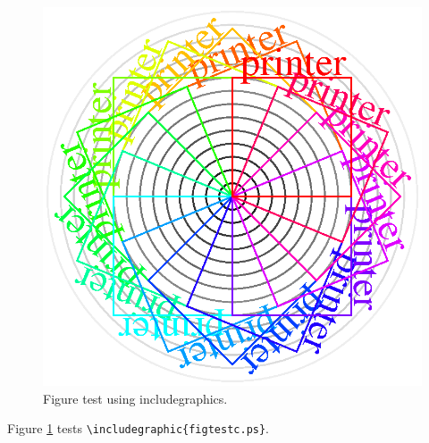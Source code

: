 \documentclass{article}
\begin{document}
\begin{figure}
\includegraphics{figtestc.ps}
\caption{Figure test using includegraphics.} 
\label{figure4}
\end{figure}

Figure  \ref{figure4} tests \verb#\includegraphic{figtestc.ps}#.  
\end{document}
